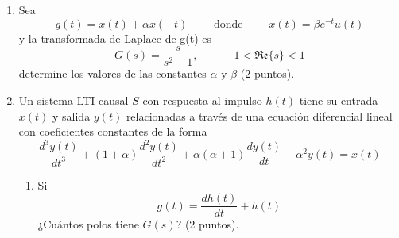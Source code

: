 \begin{enumerate}
	\item Sea
	\begin{equation*}\label{key}
	g(t)=x(t)+\alpha x(-t)\qquad\mbox{ donde }\qquad 
	x(t)=\beta e^{-t}u(t)
	\end{equation*}
	y la transformada de Laplace de g(t) es
	\begin{equation*}\label{key}
	G(s)=\frac{s}{s^2-1},\qquad -1<\mathfrak{Re}\{s\}<1
	\end{equation*}
	determine los valores de las constantes $ \alpha $ y $ \beta $ (2 puntos).
	\item Un sistema LTI causal $ S $ con respuesta al impulso $ h(t) $ tiene su entrada $ x(t) $ y salida $ y(t) $ relacionadas a través de una ecuación diferencial lineal con coeficientes constantes de la forma
	\begin{equation*}\label{key}
	\frac{d^3y(t)}{dt^3}+(1+\alpha)\frac{d^2y(t)}{dt^2}+\alpha(\alpha +1)\frac{dy(t)}{dt}+\alpha^2y(t)=x(t)
	\end{equation*}
	\begin{enumerate}
		\item Si 
		\begin{equation*}\label{key}
		g(t)=\frac{dh(t)}{dt}+h(t)
		\end{equation*}
		¿Cuántos polos tiene $ G(s) $? (2 puntos).
	\end{enumerate}
\end{enumerate}